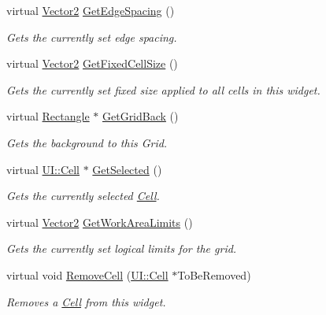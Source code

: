 \begin{DoxyCompactItemize}
virtual \hyperlink{classMezzanine_1_1Vector2}{Vector2} \hyperlink{classMezzanine_1_1UI_1_1CellGrid_a400ab7ea328f722413bb276e5dead944}{GetEdgeSpacing} ()
\begin{DoxyCompactList}\small\item\em Gets the currently set edge spacing. \item\end{DoxyCompactList}\item 
virtual \hyperlink{classMezzanine_1_1Vector2}{Vector2} \hyperlink{classMezzanine_1_1UI_1_1CellGrid_a24a055d77eaf9a73a5d9b1b778847807}{GetFixedCellSize} ()
\begin{DoxyCompactList}\small\item\em Gets the currently set fixed size applied to all cells in this widget. \item\end{DoxyCompactList}\item 
virtual \hyperlink{classMezzanine_1_1UI_1_1Rectangle}{Rectangle} $\ast$ \hyperlink{classMezzanine_1_1UI_1_1CellGrid_a56d852192197e405ccc4b12a4b7fe2ce}{GetGridBack} ()
\begin{DoxyCompactList}\small\item\em Gets the background to this Grid. \item\end{DoxyCompactList}\item 
virtual \hyperlink{classMezzanine_1_1UI_1_1Cell}{UI::Cell} $\ast$ \hyperlink{classMezzanine_1_1UI_1_1CellGrid_ab2ba8fdab8c52b374291d0bb89bb9cc7}{GetSelected} ()
\begin{DoxyCompactList}\small\item\em Gets the currently selected \hyperlink{classMezzanine_1_1UI_1_1Cell}{Cell}. \item\end{DoxyCompactList}\item 
virtual \hyperlink{classMezzanine_1_1Vector2}{Vector2} \hyperlink{classMezzanine_1_1UI_1_1CellGrid_acd18bf256b34033a7c53424d559b6dba}{GetWorkAreaLimits} ()
\begin{DoxyCompactList}\small\item\em Gets the currently set logical limits for the grid. \item\end{DoxyCompactList}\item 
virtual void \hyperlink{classMezzanine_1_1UI_1_1CellGrid_ab3b93eb4e588899e51e68fbd4bf6b84e}{RemoveCell} (\hyperlink{classMezzanine_1_1UI_1_1Cell}{UI::Cell} $\ast$ToBeRemoved)
\begin{DoxyCompactList}\small\item\em Removes a \hyperlink{classMezzanine_1_1UI_1_1Cell}{Cell} from this widget. \item\end{DoxyCompactList}\item 

\end{DoxyCompactItemize}
